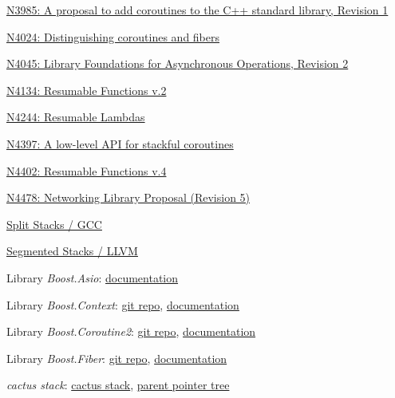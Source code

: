 \begin{thebibliography}{99}

        \href{http://www.open-std.org/jtc1/sc22/wg21/docs/papers/2014/n3985.pdf}
        {N3985: A proposal to add coroutines to the C++ standard library, Revision 1}

        \href{http://www.open-std.org/jtc1/sc22/wg21/docs/papers/2014/n4024.pdf}
        {N4024: Distinguishing coroutines and fibers}

        \href{http://www.open-std.org/jtc1/sc22/wg21/docs/papers/2014/n4045.pdf}
        {N4045: Library Foundations for Asynchronous Operations, Revision 2}

        \href{http://www.open-std.org/jtc1/sc22/wg21/docs/papers/2014/n4134.pdf}
        {N4134: Resumable Functions v.2}

        \href{http://www.open-std.org/jtc1/sc22/wg21/docs/papers/2014/n4244.pdf}
        {N4244: Resumable Lambdas}

        \href{http://www.open-std.org/jtc1/sc22/wg21/docs/papers/2015/n4397.pdf}
        {N4397: A low-level API for stackful coroutines}

        \href{https://isocpp.org/files/papers/N4402.pdf}
        {N4402: Resumable Functions v.4}

        \href{http://www.open-std.org/jtc1/sc22/wg21/docs/papers/2015/n4478.html}
        {N4478: Networking Library Proposal (Revision 5)}

        \href{http://gcc.gnu.org/wiki/SplitStacks}
        {Split Stacks / GCC}

        \href{http://llvm.org/releases/3.0/docs/SegmentedStacks.html}
        {Segmented Stacks / LLVM}

        Library \emph{Boost.Asio}:
        \href{http://www.boost.org/doc/libs/release/doc/html/boost\_asio.html} {documentation}

        Library \emph{Boost.Context}:
        \href{https://github.com/boostorg/context} {git repo},
        \href{http://www.boost.org/doc/libs/release/libs/context/doc/html/index.html} {documentation}

        Library \emph{Boost.Coroutine2}:
        \href{https://github.com/boostorg/coroutine2} {git repo},
        \href{http://www.boost.org/doc/libs/release/libs/coroutine2/doc/html/index.html} {documentation}

        Library \emph{Boost.Fiber}:
        \href{https://github.com/olk/boost-fiber} {git repo},
        \href{http://olk.github.io/libs/fiber/doc/html/index.html} {documentation}

        \emph{cactus stack}:
        \href{http://c2.com/cgi/wiki?CactusStack} {cactus stack},
        \href{http://en.wikipedia.org/wiki/Parent\_pointer\_tree} {parent pointer tree}

\end{thebibliography}
